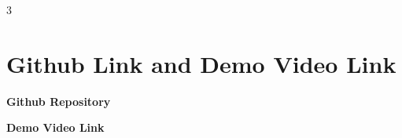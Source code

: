\documentclass[a0,portrait]{a0poster}
\begin{document}
\begin{minipage}[c]{\linewidth}
\begin{framed}
\begin{multicols}{3}
\section*{Github Link and Demo Video Link}
\vspace{-0.5cm}
\begin{center}
\begin{minipage}{0.4\linewidth}
\centering
\textbf{Github Repository}\\[1ex]
\end{minipage}\hfill
\begin{minipage}{0.4\linewidth}
\centering
\textbf{Demo Video Link}\\[1ex]
\end{minipage}
\end{center}

\end{multicols}
\vspace{0.1cm}
\end{framed}
\end{minipage}
\end{document}

